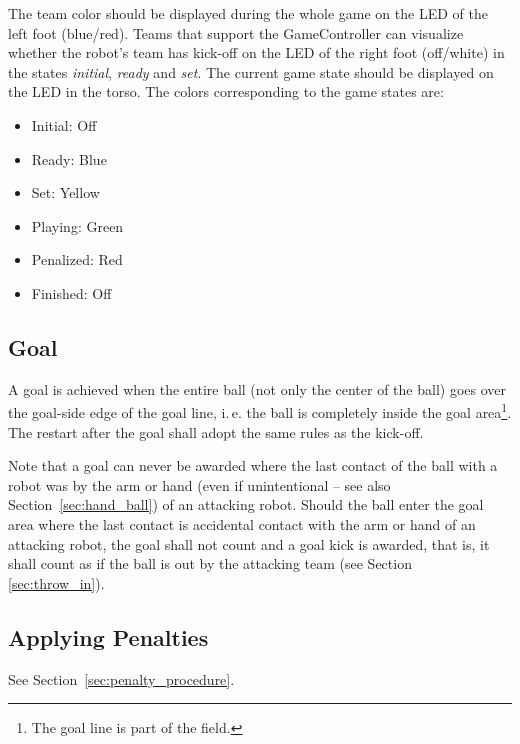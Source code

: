 \documentclass[12pt]{article}
\newcommand{\ie}{\mbox{i.\,e.}\xspace}
\begin{document}
The team color should be displayed during the whole game on the LED of the left foot (blue/red). Teams that support the GameController can visualize whether the robot's team has kick-off on the LED of the right foot (off/white) in the states \emph{initial}, \emph{ready} and \emph{set}. The current game state should be displayed on the LED in the torso. The colors corresponding to the game states are:

\begin{itemize}

\item Initial: Off

\item Ready: Blue

\item Set: Yellow

\item Playing: Green

\item Penalized: Red

\item Finished: Off

\end{itemize}

\subsection{Goal}

A goal is achieved when the entire ball (not only the center of the ball) goes over the goal-side edge of the goal line, \ie the ball is completely inside the goal area\footnote{The goal line is part of the field.}. The restart after the goal shall adopt the same rules as the kick-off.

Note that a goal can never be awarded where the last contact of the ball with a robot was by the arm or hand (even if unintentional -- see also Section~\ref{sec:hand_ball}) of an attacking robot. Should the ball enter the goal area where the last contact is accidental contact with the arm or hand of an attacking robot, the goal shall not count and a goal kick is awarded, that is, it shall count as if the ball is out by the attacking team (see Section \ref{sec:throw_in}).

\subsection{Applying Penalties}

See Section~\ref{sec:penalty_procedure}.
\end{document}
